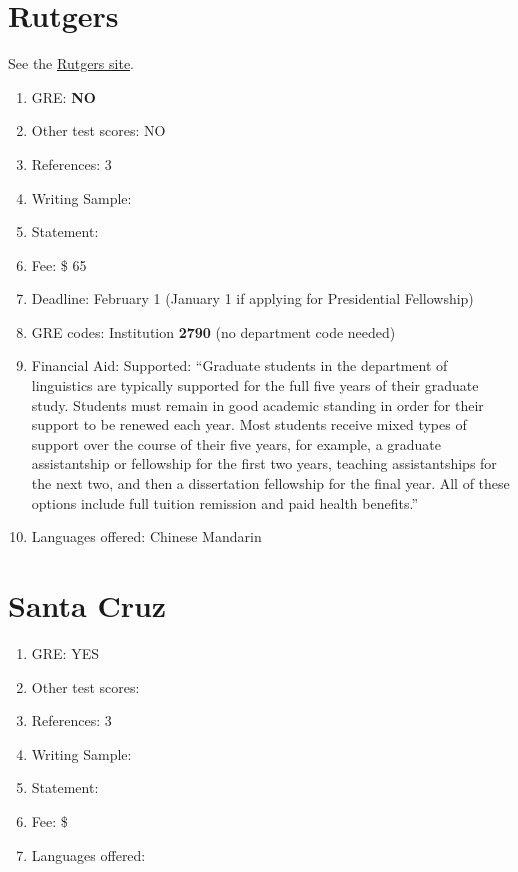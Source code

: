 \documentclass[11pt]{article}
\begin{document}
\section{Rutgers}
See the \href{http://ling.rutgers.edu/index.php?option=com_content&task=view&id=107&Itemid=153}{Rutgers site}. 
\begin{enumerate}
\item GRE: {\bf NO}
\item Other test scores: NO
\item References: 3
\item Writing Sample:
\item Statement:
\item Fee: \$ 65
\item Deadline: February 1 (January 1 if applying for Presidential Fellowship)
\item GRE codes: Institution {\bf 2790} (no department code needed)
\item Financial Aid: Supported: ``Graduate students in the department of linguistics are typically supported for the full five years of their graduate study. Students must remain in good academic standing in order for their support to be renewed each year.  Most students receive mixed types of support over the course of their five years, for example, a graduate assistantship or fellowship for the first two years, teaching assistantships for the next two, and then a dissertation fellowship for the final year. All of these options include full tuition remission and paid health benefits.''
\item Languages offered: Chinese Mandarin
\end{enumerate}


\section{Santa Cruz}
\begin{enumerate}
\item GRE: YES
\item Other test scores:
\item References: 3
\item Writing Sample:
\item Statement: 
\item Fee: \$ 
\item Languages offered: 
\end{enumerate}
\end{document}

